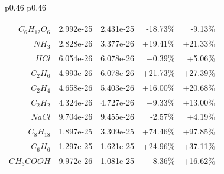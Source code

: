 \documentclass[12pt]{article}
\begin{document}
\begin{table}[htbp]
\begin{tabular}{p{0.46\linewidth} p{0.46\linewidth}}
\begin{tabular}{|rllrr|}
$C_6H_\text{12}O_6$ & 2.992e-25 & 2.431e-25 & -18.73\% \tikz[baseline=-0.5ex]{\node[draw=none,fill=red,circle,inner sep=3pt]{};}         & -9.13\% \tikz[baseline=-0.5ex]{\node[draw=none,fill=orange,circle,inner sep=3pt]{};}  \\
$NH_3$ & 2.828e-26 & 3.377e-26     & +19.41\% \tikz[baseline=-0.5ex]{\node[draw=none,fill=red,circle,inner sep=3pt]{};}          & +21.33\% \tikz[baseline=-0.5ex]{\node[draw=none,fill=red,circle,inner sep=3pt]{};}  \\
$HCl$ & 6.054e-26 & 6.078e-26     & +0.39\% \heartmarker                                                                        & +5.06\% \tikz[baseline=-0.5ex]{\node[draw=none,fill=orange,circle,inner sep=3pt]{};}  \\
$C_2H_6$ & 4.993e-26 & 6.078e-26    & +21.73\% \tikz[baseline=-0.5ex]{\node[draw=none,fill=red,circle,inner sep=3pt]{};}          & +27.39\% \tikz[baseline=-0.5ex]{\node[draw=none,fill=black,circle,inner sep=3pt]{};}  \\
$C_2H_4$ & 4.658e-26 & 5.403e-26    & +16.00\% \tikz[baseline=-0.5ex]{\node[draw=none,fill=red,circle,inner sep=3pt]{};}          & +20.68\% \tikz[baseline=-0.5ex]{\node[draw=none,fill=red,circle,inner sep=3pt]{};}  \\
$C_2H_2$ & 4.324e-26 & 4.727e-26    & +9.33\% \tikz[baseline=-0.5ex]{\node[draw=none,fill=orange,circle,inner sep=3pt]{};}        & +13.00\% \tikz[baseline=-0.5ex]{\node[draw=none,fill=red,circle,inner sep=3pt]{};}  \\
$NaCl$ & 9.704e-26 & 9.455e-26    & -2.57\% \tikz[baseline=-0.5ex]{\node[draw=none,fill=orange,circle,inner sep=3pt]{};}      & +4.19\% \tikz[baseline=-0.5ex]{\node[draw=none,fill=orange,circle,inner sep=3pt]{};}  \\
$C_8H_\text{18}$ & 1.897e-25 & 3.309e-25   & +74.46\% \tikz[baseline=-0.5ex]{\node[draw=none,fill=black,circle,inner sep=3pt]{};}        & +97.85\% \tikz[baseline=-0.5ex]{\node[draw=none,fill=black,circle,inner sep=3pt]{};}  \\
$C_6H_6$ & 1.297e-25 & 1.621e-25    & +24.96\% \tikz[baseline=-0.5ex]{\node[draw=none,fill=red,circle,inner sep=3pt]{};}          & +37.11\% \tikz[baseline=-0.5ex]{\node[draw=none,fill=black,circle,inner sep=3pt]{};}  \\
$CH_3COOH$ & 9.972e-26 & 1.081e-25 & +8.36\% \tikz[baseline=-0.5ex]{\node[draw=none,fill=orange,circle,inner sep=3pt]{};}        & +16.62\% \tikz[baseline=-0.5ex]{\node[draw=none,fill=red,circle,inner sep=3pt]{};}  \\

\end{tabular}
\end{tabular}
\end{table}
\end{document}
